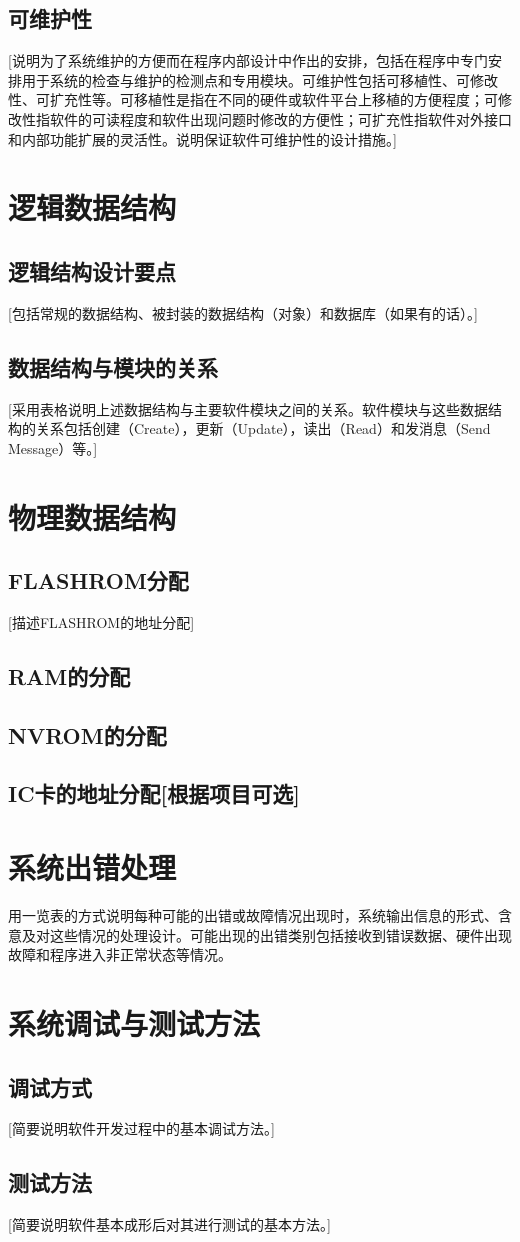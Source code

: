 \documentclass[10pt,a4paper,titlepage]{article} %
\begin{document}
\subsection{可维护性}
[说明为了系统维护的方便而在程序内部设计中作出的安排，包括在程序中专门安排用于系统的检查与维护的检测点和专用模块。可维护性包括可移植性、可修改性、可扩充性等。可移植性是指在不同的硬件或软件平台上移植的方便程度；可修改性指软件的可读程度和软件出现问题时修改的方便性；可扩充性指软件对外接口和内部功能扩展的灵活性。说明保证软件可维护性的设计措施。]\newline
\section{逻辑数据结构}
\subsection{逻辑结构设计要点}
[包括常规的数据结构、被封装的数据结构（对象）和数据库（如果有的话）。]\newline
\subsection{数据结构与模块的关系}
[采用表格说明上述数据结构与主要软件模块之间的关系。软件模块与这些数据结构的关系包括创建（Create），更新（Update），读出（Read）和发消息（Send Message）等。]\newline
\section{物理数据结构}
\subsection{FLASHROM分配}
[描述FLASHROM的地址分配]\newline
\subsection{RAM的分配}
\subsection{NVROM的分配}
\subsection{IC卡的地址分配[根据项目可选]}
\section{系统出错处理}
用一览表的方式说明每种可能的出错或故障情况出现时，系统输出信息的形式、含意及对这些情况的处理设计。可能出现的出错类别包括接收到错误数据、硬件出现故障和程序进入非正常状态等情况。\newline
\section{系统调试与测试方法}
\subsection{调试方式}
[简要说明软件开发过程中的基本调试方法。]\newline
\subsection{测试方法}
[简要说明软件基本成形后对其进行测试的基本方法。]
\end{document}
